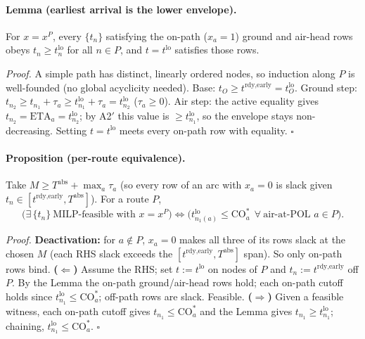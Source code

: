 \documentclass[11pt,a4paper]{article}
\theoremstyle{definition}
\begin{document}
\paragraph{Lemma (earliest arrival is the lower envelope).}
For $x = x^P$, every $\{t_n\}$ satisfying the on-path ($x_a = 1$) ground and
air-head rows obeys $t_n \geq t^{\text{lo}}_n$ for all $n \in P$, and
$t = t^{\text{lo}}$ satisfies those rows.

\emph{Proof.} A simple path has distinct, linearly ordered nodes, so induction
along $P$ is well-founded (no global acyclicity needed). Base: $t_O \geq
t^{\text{rdy,early}} = t^{\text{lo}}_O$. Ground step: $t_{n_2} \geq t_{n_1} +
\tau_a \geq t^{\text{lo}}_{n_1} + \tau_a = t^{\text{lo}}_{n_2}$ ($\tau_a \geq
0$). Air step: the active equality gives $t_{n_2} = \text{ETA}_a =
t^{\text{lo}}_{n_2}$; by A2$'$ this value is $\geq t^{\text{lo}}_{n_1}$, so the
envelope stays non-decreasing. Setting $t = t^{\text{lo}}$ meets every on-path
row with equality. \hfill$\square$

\paragraph{Proposition (per-route equivalence).}
Take $M \geq T^{\text{abs}} + \max_a \tau_a$ (so every row of an arc with
$x_a = 0$ is slack given $t_n \in [t^{\text{rdy,early}}, T^{\text{abs}}]$). For
a route $P$,
\[
\big(\exists\,\{t_n\}\ \text{MILP-feasible with } x = x^P\big)
\iff
\big(t^{\text{lo}}_{n_1(a)} \leq \text{CO}_a^*\ \ \forall\ \text{air-at-POL } a \in P\big).
\]

\emph{Proof.} \textbf{Deactivation:} for $a \notin P$, $x_a = 0$ makes all
three of its rows slack at the chosen $M$ (each RHS slack exceeds the
$[t^{\text{rdy,early}}, T^{\text{abs}}]$ span). So only on-path rows bind.
\textbf{($\Leftarrow$)} Assume the RHS; set $t := t^{\text{lo}}$ on nodes of
$P$ and $t_n := t^{\text{rdy,early}}$ off $P$. By the Lemma the on-path
ground/air-head rows hold; each on-path cutoff holds since $t^{\text{lo}}_{n_1}
\leq \text{CO}_a^*$; off-path rows are slack. Feasible.
\textbf{($\Rightarrow$)} Given a feasible witness, each on-path cutoff gives
$t_{n_1} \leq \text{CO}_a^*$ and the Lemma gives $t_{n_1} \geq
t^{\text{lo}}_{n_1}$; chaining, $t^{\text{lo}}_{n_1} \leq \text{CO}_a^*$.
\hfill$\square$
\end{document}
